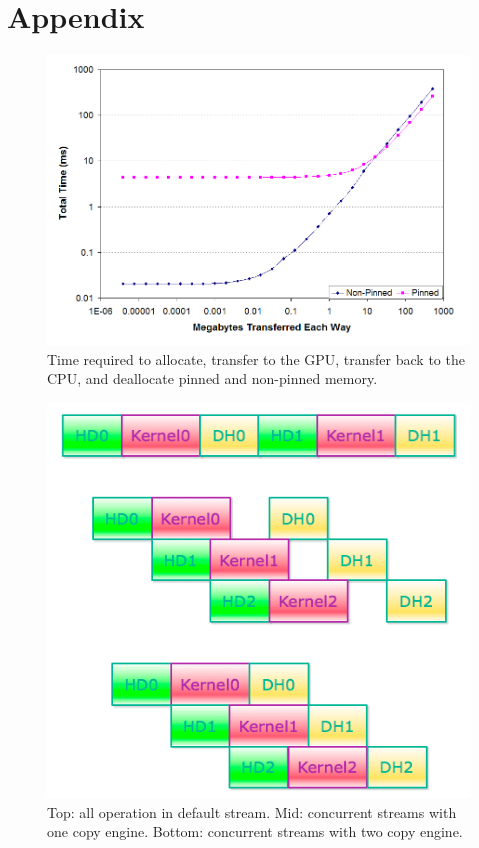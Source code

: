 \documentclass[journal,11pt,onecolumn,draftclsnofoot]{ieeeconf}  %
\begin{document}
\clearpage
\appendix
\section{Appendix}
\begin{figure}[h]
	\centering\includegraphics[width=120mm]{pinned_trade_off.png}
	\caption{Time required to allocate, transfer to the GPU, transfer back to the CPU, and deallocate pinned and non-pinned memory.\cite{Trade_off}}
	\label{Time required to allocate, transfer to the GPU, transfer back to the CPU, and deallocate pinned and non-pinned memory.}
\end{figure}
\begin{figure}[h]
	\centering\includegraphics[width=120mm]{concurrent.png}
	\caption{Top: all operation in default stream. Mid: concurrent streams with one copy engine. Bottom: concurrent streams with two copy engine.}
	\label{concurrent}
\end{figure}
\end{document}
